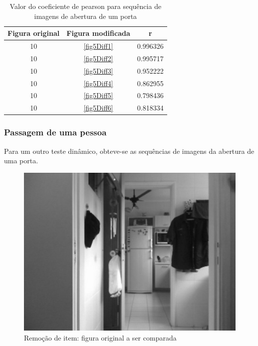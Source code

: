\documentclass[10pt,a4paper]{article}
\begin{document}
\vspace{-0.5cm}
\begin{table}[h!]
  \begin{center}
    \caption{Valor do coeficiente de pearson para sequência de imagens
      de abertura de um porta}
    \begin{tabular}{|c|c|c|}
      \hline
      Figura original & Figura modificada & r\\
      \hline
      10 &  \ref{fig5Diff1} & 0.996326\\
      10 &  \ref{fig5Diff2} & 0.995717\\
      10 &  \ref{fig5Diff3} & 0.952222\\
      10 &  \ref{fig5Diff4} & 0.862955\\
      10 &  \ref{fig5Diff5} & 0.798436\\
      10 &  \ref{fig5Diff6} & 0.818334\\
      \hline
    \end{tabular}
  \end{center}
\end{table}


\newpage
\subsubsection{Passagem de uma pessoa}
Para um outro teste dinâmico, obteve-se as sequências de imagens da
abertura de uma porta.

\begin{figure}[h!]
\begin{center}
\includegraphics[scale=0.35]{photos/pessoa/gBase}
\caption{Remoção de item: figura original a ser comparada}
\end{center}
\label{pessoa}
\end{figure}
\end{document}
